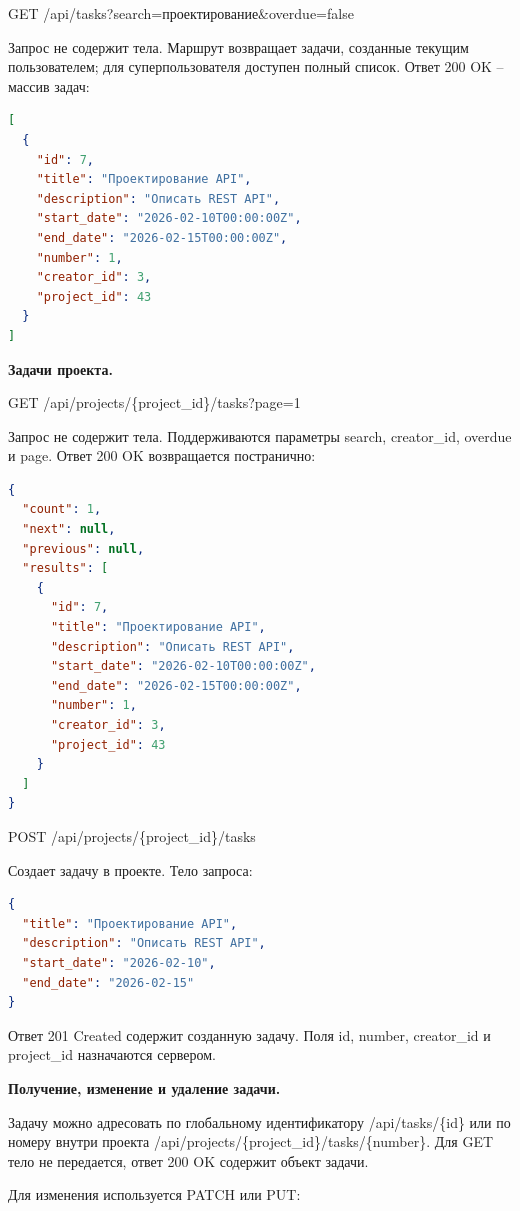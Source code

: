 GET /api/tasks?search=проектирование\&overdue=false

Запрос не содержит тела. Маршрут возвращает задачи, созданные текущим пользователем; для суперпользователя доступен полный список. Ответ 200 OK -- массив задач:

\begin{lstlisting}[numbers=none, language=json]
[
  {
    "id": 7,
    "title": "Проектирование API",
    "description": "Описать REST API",
    "start_date": "2026-02-10T00:00:00Z",
    "end_date": "2026-02-15T00:00:00Z",
    "number": 1,
    "creator_id": 3,
    "project_id": 43
  }
]
\end{lstlisting}


\textbf{Задачи проекта.}

GET /api/projects/\{project\_id\}/tasks?page=1

Запрос не содержит тела. Поддерживаются параметры search, creator\_id, overdue и page. Ответ 200 OK возвращается постранично:

\begin{lstlisting}[numbers=none, language=json]
{
  "count": 1,
  "next": null,
  "previous": null,
  "results": [
    {
      "id": 7,
      "title": "Проектирование API",
      "description": "Описать REST API",
      "start_date": "2026-02-10T00:00:00Z",
      "end_date": "2026-02-15T00:00:00Z",
      "number": 1,
      "creator_id": 3,
      "project_id": 43
    }
  ]
}
\end{lstlisting}


POST /api/projects/\{project\_id\}/tasks

Создает задачу в проекте. Тело запроса:

\begin{lstlisting}[numbers=none, language=json]
{
  "title": "Проектирование API",
  "description": "Описать REST API",
  "start_date": "2026-02-10",
  "end_date": "2026-02-15"
}
\end{lstlisting}


Ответ 201 Created содержит созданную задачу. Поля id, number, creator\_id и project\_id назначаются сервером.

\textbf{Получение, изменение и удаление задачи.}

Задачу можно адресовать по глобальному идентификатору /api/tasks/\{id\} или по номеру внутри проекта /api/projects/\{project\_id\}/tasks/\{number\}. Для GET тело не передается, ответ 200 OK содержит объект задачи.

Для изменения используется PATCH или PUT:

